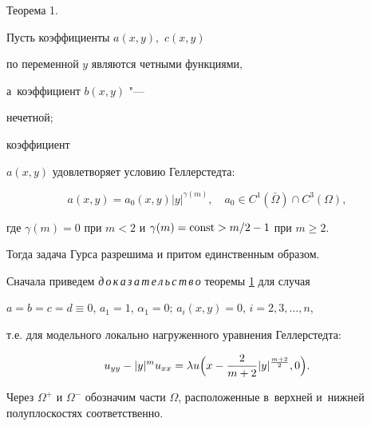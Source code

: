 \smallskip



\hypertarget{att:th1}{}



{\small\sc Теорема 1.} \it  

Пусть коэффициенты $a(x, y),$ $c(x, y)$ 

по переменной $y$ являются четными функциями$,$ 

а~коэффициент $b(x, y)$ "---

нечетной$;$ 

коэффициент

$a(x,y)$  удовлетворяет условию Геллерстедта\/{\rm:}

\begin{equation}

\label{Attfor2015_5}

a(x, y)=a_0(x,y)|y|^{\gamma (m)}, \quad  

a_0\in C^1(\bar{\Omega})\cap C^3(\Omega),

\end{equation}

где $\gamma(m)=0$ при $m<2$ и $\gamma(m)={\rm const }>{m}/{2}-1$ при $m\geqslant 2.$



Тогда задача Гурса разрешима и притом  единственным образом.



\rm



\smallskip



Сначала приведем \textit{д\,о\,к\,а\,з\,а\,т\,е\,л\,ь\,с\,т\,в\,о\/} теоремы \hyperlink{att:th1}{1}  для случая

$a=b=c=d\equiv 0$, $a_1=1$, $\alpha_1=0$; $a_i(x,y)=0$, $i=2, 3, \dots, n$,

т.е. для модельного локально нагруженного уравнения Геллерстедта:

\begin{equation}

\label{Attfor2015_6}

u_{yy}-|y|^m u_{xx}=\lambda u\Bigl( x-\frac{2}{m+2}|y|^{\frac{m+2}{2}} , 0 \Bigr).

\end{equation}







Через $\Omega^+$ и $\Omega^-$ обозначим части $\Omega$, расположенные в~верхней  и~нижней полуплоскостях соответственно.



